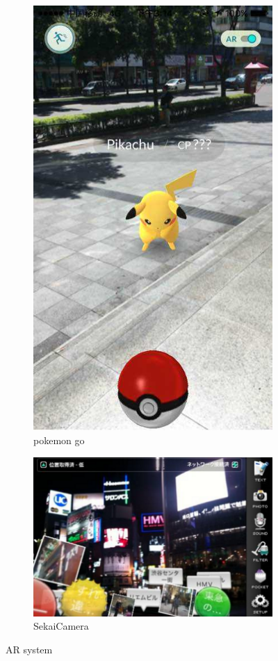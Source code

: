 \documentclass[a4paper,11pt]{article}
\begin{document}
\begin{figure}[!htp]
		\centering
		\begin{subfigure}{.5\textwidth}
			\centering
			\includegraphics[width=0.7\linewidth]{1.jpg}
			\caption{pokemon go}
		
		\end{subfigure}%
		\begin{subfigure}{.5\textwidth}
			\centering
			\includegraphics[width=1.2\linewidth]{2.png}
			\caption{SekaiCamera}
			
		\end{subfigure}
		\caption{AR system}
		\label{fig:fig1}
	\end{figure}
\end{document}
